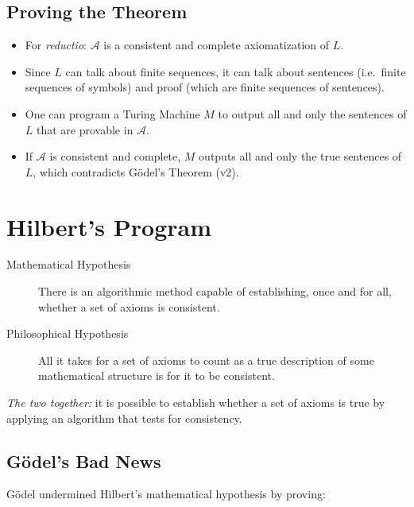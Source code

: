 \documentclass[12pt]{extarticle}
\begin{document}
\subsection{Proving the Theorem}


\begin{itemize}


\item For \emph{reductio}:  $\mathcal{A}$ is a consistent and complete axiomatization of $L$.

\item Since $L$ can talk about finite sequences, it can talk about sentences (i.e.~finite sequences of symbols) and proof (which are finite sequences of sentences).

\item One can program a Turing Machine $M$ to output all and only the sentences of $L$ that are provable in $\mathcal{A}$.

\item If $\mathcal{A}$ is consistent and complete, $M$ outputs all and only the true sentences of $L$, which contradicts G\"odel's Theorem (v2).


\end{itemize}






\section{Hilbert's Program}


\begin{description}
\item[Mathematical Hypothesis]
  There is an algorithmic method capable of establishing, once and for
  all, whether a set of axioms is consistent.
\item[Philosophical Hypothesis]
  All it takes for a set of axioms to count as a true description of
  some mathematical structure is for it to be consistent.
\end{description}

\noindent
\emph{The two together:} it is possible to establish whether a set of axioms is true
by applying an algorithm that tests for consistency.


\subsection{G\"odel's Bad News}

G\"odel undermined Hilbert's mathematical hypothesis by proving:
\end{document}
